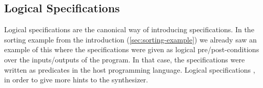 \subsection{Logical Specifications}
\label{sec:logical}

Logical specifications are the canonical way of introducing specifications. In
the sorting example from the introduction (\ref{sec:sorting-example}) we already
saw an example of this where the specifications were given as logical
pre/post-conditions over the inputs/outputs of the program. In that case, the
specifications were written as predicates in the host programming language.
Logical specifications , in order to give more hints to the
synthesizer.

